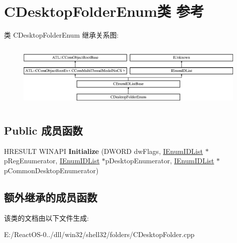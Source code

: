 \hypertarget{class_c_desktop_folder_enum}{}\section{C\+Desktop\+Folder\+Enum类 参考}
\label{class_c_desktop_folder_enum}
类 C\+Desktop\+Folder\+Enum 继承关系图\+:\begin{figure}[H]
\begin{center}
\leavevmode
\includegraphics[height=3.181818cm]{class_c_desktop_folder_enum}
\end{center}
\end{figure}
\subsection*{Public 成员函数}
\begin{DoxyCompactItemize}
\item 
\mbox{\label{class_c_desktop_folder_enum_a84c50c724367093c1f5116dadb6decb8}} 
H\+R\+E\+S\+U\+LT W\+I\+N\+A\+PI {\bfseries Initialize} (D\+W\+O\+RD dw\+Flags, \hyperlink{interface_i_enum_i_d_list}{I\+Enum\+I\+D\+List} $\ast$p\+Reg\+Enumerator, \hyperlink{interface_i_enum_i_d_list}{I\+Enum\+I\+D\+List} $\ast$p\+Desktop\+Enumerator, \hyperlink{interface_i_enum_i_d_list}{I\+Enum\+I\+D\+List} $\ast$p\+Common\+Desktop\+Enumerator)
\end{DoxyCompactItemize}
\subsection*{额外继承的成员函数}


该类的文档由以下文件生成\+:\begin{DoxyCompactItemize}
\item 
E\+:/\+React\+O\+S-\/0../dll/win32/shell32/folders/C\+Desktop\+Folder.\+cpp\end{DoxyCompactItemize}
